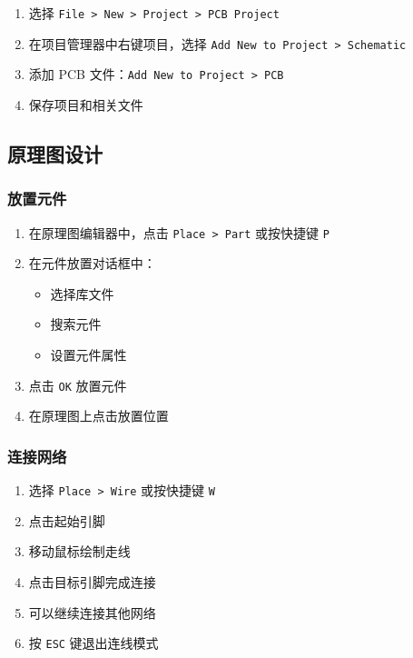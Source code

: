 \begin{enumerate}
  \item 选择 \lstinline{File > New > Project > PCB Project}
  \item 在项目管理器中右键项目，选择 \lstinline{Add New to Project > Schematic}
  \item 添加 PCB 文件：\lstinline{Add New to Project > PCB}
  \item 保存项目和相关文件
\end{enumerate}

\subsection{原理图设计}

\subsubsection{放置元件}


\begin{enumerate}
  \item 在原理图编辑器中，点击 \lstinline{Place > Part} 或按快捷键 \lstinline{P}
  \item 在元件放置对话框中：
    \begin{itemize}
      \item 选择库文件
      \item 搜索元件
      \item 设置元件属性
    \end{itemize}
  \item 点击 \lstinline{OK} 放置元件
  \item 在原理图上点击放置位置
\end{enumerate}

\subsubsection{连接网络}


\begin{enumerate}
  \item 选择 \lstinline{Place > Wire} 或按快捷键 \lstinline{W}
  \item 点击起始引脚
  \item 移动鼠标绘制走线
  \item 点击目标引脚完成连接
  \item 可以继续连接其他网络
  \item 按 \lstinline{ESC} 键退出连线模式
\end{enumerate}

